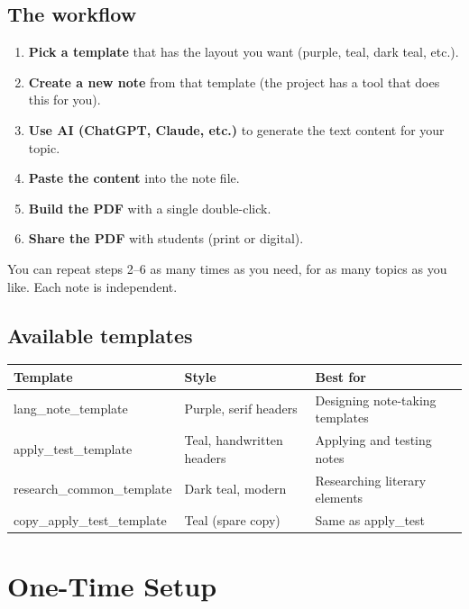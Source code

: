 \documentclass[a4paper,11pt]{article}
\begin{document}
\subsection{The workflow}

\begin{enumerate}[itemsep=8pt]
  \item \textbf{Pick a template} that has the layout you want (purple, teal, dark teal, etc.).
  \item \textbf{Create a new note} from that template (the project has a tool that does this for you).
  \item \textbf{Use AI (ChatGPT, Claude, etc.)} to generate the text content for your topic.
  \item \textbf{Paste the content} into the note file.
  \item \textbf{Build the PDF} with a single double-click.
  \item \textbf{Share the PDF} with students (print or digital).
\end{enumerate}

You can repeat steps 2--6 as many times as you need, for as many topics as you like. Each note is independent.

\subsection{Available templates}

\begin{center}
\begin{tabularx}{\textwidth}{l l X}
\toprule
\textbf{Template} & \textbf{Style} & \textbf{Best for} \\
\midrule
lang\_note\_template & Purple, serif headers & Designing note-taking templates \\
apply\_test\_template & Teal, handwritten headers & Applying and testing notes \\
research\_common\_template & Dark teal, modern & Researching literary elements \\
copy\_apply\_test\_template & Teal (spare copy) & Same as apply\_test \\
\bottomrule
\end{tabularx}
\end{center}

\section{One-Time Setup}
\end{document}
